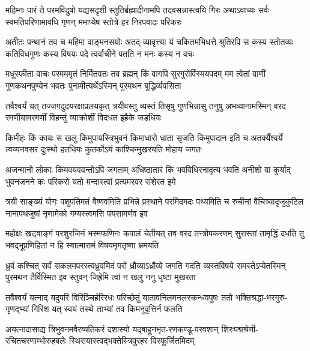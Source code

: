 
\fourlineindentedshloka
{महिम्नः पारं ते परमविदुषो यद्यसदृशी}
{स्तुतिर्ब्रह्मादीनामपि तदवसन्नास्त्वयि गिरः}
{अथाऽवाच्यः सर्वः स्वमतिपरिणामावधि गृणन्}
{ममाप्येष स्तोत्रे हर निरपवादः परिकरः}%

\fourlineindentedshloka
{अतीतः पन्थानं तव च महिमा वाङ्मनसयोः}
{अतद्-व्यावृत्त्या यं चकितमभिधत्ते श्रुतिरपि}
{स कस्य स्तोतव्यः कतिविधगुणः कस्य विषयः}
{पदे त्वर्वाचीने पतति न मनः कस्य न वचः}%

\fourlineindentedshloka
{मधुस्फीता वाचः परमममृतं निर्मितवतः}
{तव ब्रह्मन् किं वागपि सुरगुरोर्विस्मयपदम्}
{मम त्वेतां वाणीं गुणकथनपुण्येन भवतः}
{पुनामीत्यर्थेऽस्मिन् पुरमथन बुद्धिर्व्यवसिता}%

\fourlineindentedshloka
{तवैश्वर्यं यत् तज्जगदुदयरक्षाप्रलयकृत्}
{त्रयीवस्तु व्यस्तं तिसृषु गुणभिन्नासु तनुषु}
{अभव्यानामस्मिन् वरद रमणीयामरमणीं}
{विहन्तुं व्याक्रोशीं विदधत इहैके जडधियः}%

\fourlineindentedshloka
{किमीहः किं कायः स खलु किमुपायस्त्रिभुवनं}
{किमाधारो धाता सृजति किमुपादान इति च}
{अतर्क्यैश्वर्ये त्वय्यनवसर दुःस्थो हतधियः}
{कुतर्कोऽयं कांश्चिन्मुखरयति मोहाय जगतः}%

\fourlineindentedshloka
{अजन्मानो लोकाः किमवयववन्तोऽपि जगताम्}
{अधिष्ठातारं किं भवविधिरनादृत्य भवति}
{अनीशो वा कुर्याद् भुवनजनने कः परिकरो}
{यतो मन्दास्त्वां प्रत्यमरवर संशेरत इमे}%

\fourlineindentedshloka
{त्रयी साङ्ख्यं योगः पशुपतिमतं वैष्णवमिति}
{प्रभिन्ने प्रस्थाने परमिदमदः पथ्यमिति च}
{रुचीनां वैचित्र्यादृजुकुटिल नानापथजुषां}
{नृणामेको गम्यस्त्वमसि पयसामर्णव इव}%

\fourlineindentedshloka
{महोक्षः खट्वाङ्गं परशुरजिनं भस्मफणिनः}
{कपालं चेतीयत् तव वरद तन्त्रोपकरणम्}
{सुरास्तां तामृद्धिं दधति तु भवद्भूप्रणिहितां}
{न हि स्वात्मारामं विषयमृगतृष्णा भ्रमयति}%

\fourlineindentedshloka
{ध्रुवं कश्चित् सर्वं सकलमपरस्त्वध्रुवमिदं}
{परो ध्रौव्याऽध्रौव्ये जगति गदति व्यस्तविषये}
{समस्तेऽप्येतस्मिन् पुरमथन तैर्विस्मित इव}
{स्तुवन् जिह्रेमि त्वां न खलु ननु धृष्टा मुखरता}%

\fourlineindentedshloka
{तवैश्वर्यं यत्नाद् यदुपरि विरिञ्चिर्हरिरधः}
{परिच्छेतुं यातावनिलमनलस्कन्धवपुषः}
{ततो भक्तिश्रद्धा-भरगुरु-गृणद्भ्यां गिरिश यत्}
{स्वयं तस्थे ताभ्यां तव किमनुवृत्तिर्न फलति}%

\fourlineindentedshloka
{अयत्नादासाद्य त्रिभुवनमवैरव्यतिकरं}
{दशास्यो यद्बाहूनभृत-रणकण्डू-परवशान्}
{शिरःपद्मश्रेणी-रचितचरणाम्भोरुहबलेः}
{स्थिरायास्त्वद्भक्तेस्त्रिपुरहर विस्फूर्जितमिदम्}%

